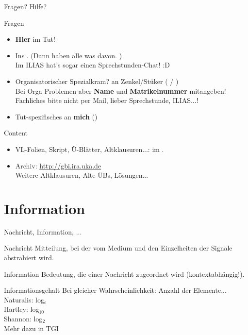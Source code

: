 \begin{frame}{Fragen? Hilfe?}	
	\begin{block}{Fragen}
		\begin{itemize}
			\item \textbf{Hier} im Tut!
			\item Ins \ILIAS. (Dann haben alle was davon. \smiley) \\
				  Im ILIAS hat's sogar einen Sprechstunden-Chat! :D
			\item Organisatorischer Spezialkram? \impl an Zenkel/Stüker ( / ) \\
			Bei Orga-Problemen aber \textbf{Name} und \textbf{Matrikelnummer}  mitangeben! \\
			Fachliches bitte nicht per Mail, lieber \impl Sprechstunde, ILIAS...!
			\item Tut-spezifisches an \textbf{mich} (\mailto{\mymail})
		\end{itemize}
	\end{block}
	
	\begin{block}{Content}
		\begin{itemize}
			\item VL-Folien, Skript, Ü-Blätter, Altklausuren...: im \ILIAS.
			\item Archiv: \url{http://gbi.ira.uka.de} \\
			Weitere Altklausuren, Alte ÜBs, Lösungen...
		\end{itemize}
	\end{block}
\end{frame}


\section{Information}

\begin{frame}{Nachricht, Information, ...}
	
	\begin{block}{Nachricht}
		      Mitteilung, bei der vom Medium und den Einzelheiten der Signale abstrahiert wird.
	\end{block}
	
	\pause
	\begin{block}{Information}
		      Bedeutung, die einer Nachricht zugeordnet wird (kontextabhängig!).
	\end{block}
	
	\pause
	\begin{block}{Informationsgehalt}
		Bei gleicher Wahrscheinlichkeit: Anzahl der Elemente... \\
		      Naturalis: log$_{e}$ \\
		      Hartley: log$_{10}$ \\
		      Shannon: log$_{2}$ \\[1em]
		\impl Mehr dazu in TGI
	\end{block}

\end{frame}

